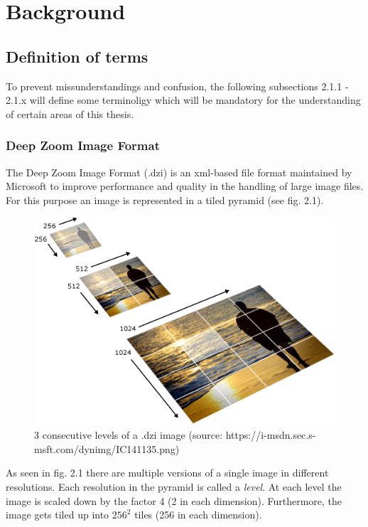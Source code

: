 \chapter{Background}
\section{Definition of terms}
To prevent missunderstandings and confusion, the following subsections 2.1.1 - 2.1.x will define some terminoligy which will be mandatory for the understanding of certain areas of this thesis.

\subsection{Deep Zoom Image Format}
The Deep Zoom Image Format (.dzi) is an xml-based file format maintained by Microsoft to improve performance and quality in the handling of large image files. For this purpose an image is represented in a tiled pyramid (see fig. 2.1).
			
\begin{figure}[!htbp]
	\begin{center}
		\includegraphics[scale=0.5]{img/dzi_pyramid.png}
		\caption{3 consecutive levels of a .dzi image (source: https://i-msdn.sec.s-msft.com/dynimg/IC141135.png)}
		\label{fig:fig2.1}
	\end{center}
\end{figure}

As seen in fig. 2.1 there are multiple versions of a single image in different resolutions. Each resolution in the pyramid is called a \emph{level}. At each level the image is scaled down by the factor 4 (2 in each dimension). Furthermore, the image gets tiled up into $256^2$ tiles (256 in each dimension)\cite{web:dzi}.

